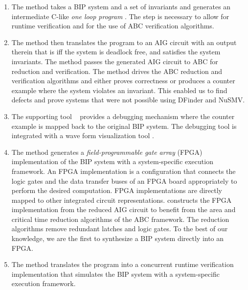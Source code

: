 \begin{enumerate}
\item The method takes a BIP system and a set of invariants and generates 
  an intermediate C-like {\em one loop program } \caig. 
  The \caig step is necessary to allow for runtime verification and for the use
  of ABC verification algorithms. 

\item The method then translates the \caig program to 
  an AIG circuit with an output therein that is \true iff the system 
  is deadlock free, and satisfies the system invariants. 
  The method passes the generated AIG circuit to ABC for reduction and 
  verification. 
  The method drives the ABC reduction and verification algorithms and 
  either proves correctness or produces a counter example where the 
  system violates an invariant. 
  This enabled us to find defects and prove systems that were not 
  possible using DFinder and NuSMV. 

\item  The supporting tool \biptool~ provides a debugging mechanism where the 
  counter example is mapped back to the original BIP system. 
  The debugging tool is integrated with a wave form visualization tool 
  \cite{bybell2010gtkwave}.  
\item The method generates a {\em field-programmable gate array} (FPGA) 
  implementation of the BIP system with a 
  system-specific execution framework. 
  An FPGA implementation is a configuration that connects the logic gates 
  and the data transfer buses of an FPGA board 
  appropriately to perform the desired computation. 
  FPGA implementations are directly mapped to other integrated circuit representations. 
  \biptool{} constructs the FPGA implementation from the reduced AIG circuit 
  to benefit from the area and critical time reduction algorithms 
  of the ABC framework. 
  The reduction algorithms remove redundant latches and logic gates.  To the best of our knowledge, we are the first to synthesize a BIP system directly 
  into an FPGA. 
\item The method translates the \caig program into a concurrent runtime verification 
  implementation that simulates the BIP 
  system with a system-specific execution framework. 
\end{enumerate}


